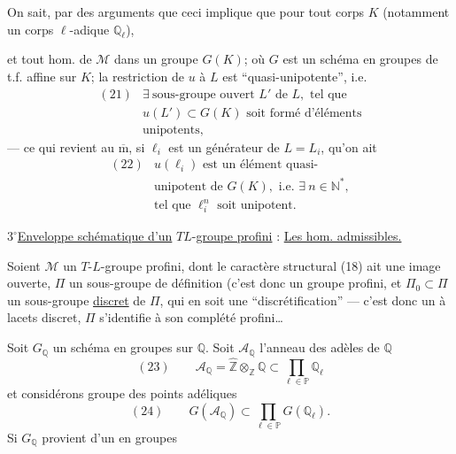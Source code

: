 On sait, par des arguments  que ceci implique que pour tout  corps $K$  (notamment un corps $\ell$-adique $\mathbb{Q}_{\ell}$),


et tout hom. de $\mathcal{M}$ dans un groupe $G(K)$; où $G$ est un schéma en groupes de t.f. affine sur $K$; 
la restriction de $u$ à $L$ est ``quasi-unipotente'', i.e.
\[
\begin{array}{ll}
(21)&\exists\ \text{sous-groupe ouvert }L'\text{ de }L,\text{ tel que}\\
&u(L')\subset G(K)\text{ soit formé d'éléments}\\
&\text{unipotents},
\end{array}
\]
--- ce qui revient au $\overline{\mathrm m}$, si $\ell_i$ est un générateur de $L=L_i$, qu'on ait
\[
\begin{array}{ll}
(22)&u(\ell_i)\text{ est un élément quasi-}\\
&\text{unipotent de }G(K),\text{ i.e. }\exists\ n\in\mathbb{N}^{*},\\
&\text{tel que }\ell_i^{n}\text{ soit unipotent}.
\end{array}
\]


\textcircled{\(3^\circ\)}\quad \uline{Enveloppe schématique d'un} \(T\)\unsure{-}\(L\)-\uline{groupe profini} :  \uline{Les hom. admissibles.}

Soient \(\mathcal{M}\) un \(T\)-\(L\)-groupe profini, dont le caractère structural (18)
ait une image ouverte, \(\Pi\) un sous-groupe de définition  (c'est donc un groupe  profini\unsure{)|]}, et \(\Pi_0\subset\Pi\) un sous-groupe \uline{discret} de \(\Pi\), qui en soit une ``discrétification'' --- c'est donc un  à lacets discret,  \(\Pi\) s'identifie à son complété profini\ldots

Soit \(G_{\mathbb{Q}}\) un schéma en groupes  sur \(\mathbb{Q}\). Soit \(\mathcal{A}_{\mathbb{Q}}\) l'anneau des adèles de \(\mathbb{Q}\)
\[
(23)\qquad \mathcal{A}_{\mathbb{Q}}=\widehat{\mathbb{Z}}\otimes_{\mathbb{Z}}\mathbb{Q}\subset\prod_{\ell\in\mathbb{P}}\mathbb{Q}_{\ell}
\]
et considérons  groupe des points adéliques
\[
(24)\qquad G(\mathcal{A}_{\mathbb{Q}})\subset\prod_{\ell\in\mathbb{P}}G(\mathbb{Q}_{\ell}).
\]
Si \(G_{\mathbb{Q}}\) provient d'un  en groupes

